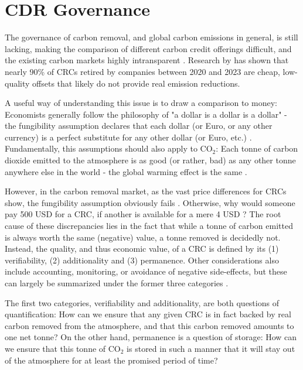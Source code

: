 \section{CDR Governance}
The governance of carbon removal, and global carbon emissions in general, is still lacking, making the comparison of different carbon credit offerings difficult, and the existing carbon markets highly intransparent \parencite{roston_market_2025}. Research by \textcite{trencher_demand_2024} has shown that nearly 90\% of CRCs retired by companies between 2020 and 2023 are cheap, low-quality offsets that likely do not provide real emission reductions.\vspace{2mm}

A useful way of understanding this issue is to draw a comparison to money: Economists generally follow the philosophy of "a dollar is a dollar is a dollar" - the fungibility assumption declares that each dollar (or Euro, or any other currency) is a perfect substitute for any other dollar (or Euro, etc.) \parencite{zelizer_dollar_2017}. Fundamentally, this assumptions should also apply to CO$_2$: Each tonne of carbon dioxide emitted to the atmosphere is as good (or rather, bad) as any other tonne anywhere else in the world - the global warming effect is the same \parencite{ritchie_co_2023}.\vspace{2mm}

However, in the carbon removal market, as the vast price differences for CRCs show, the fungibility assumption obviously fails \parencite{roston_market_2025}. Otherwise, why would someone pay 500 USD for a CRC, if another is available for a mere 4 USD \parencite{reichelstein_accounting_2024} ? The root cause of these discrepancies lies in the fact that while a tonne of carbon emitted is always worth the same (negative) value, a tonne removed is decidedly not. Instead, the quality, and thus economic value, of a CRC is defined by its (1) verifiability, (2) additionality and (3) permanence. Other considerations also include accounting, monitoring, or avoidance of negative side-effects, but these can largely be summarized under the former three categories \parencite{axelsson_revised_2024}.\vspace{2mm}

The first two categories, verifiability and additionality, are both questions of quantification: How can we ensure that any given CRC is in fact backed by real carbon removed from the atmosphere, and that this carbon removed amounts to one net tonne? On the other hand, permanence is a question of storage: How can we ensure that this tonne of CO$_2$ is stored in such a manner that it will stay out of the atmosphere for at least the promised period of time? \parencite{loffler_2025_2025}\vspace{2mm}

